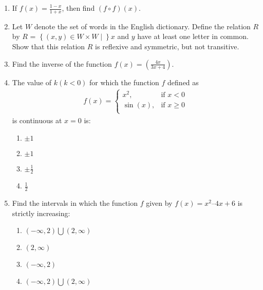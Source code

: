 \documentclass{article}
\providecommand{\cbrak}[1]{\ensuremath{\left\{#1\right\}}}
\begin{document}
\begin{enumerate}

\item If $f(x) = \frac{1-x}{1+x}$, then find $(f\circ f)(x)$.


\item Let $W$ denote the set of words in the English dictionary. Define the relation $R$ by
$R$ = $\cbrak{(x, y) \in W \times W \mid} x$ and $y$ have at least one letter in common.
Show that this relation $R$ is reflexive and symmetric, but not transitive.
\item Find the inverse of the function $f(x) = (\frac{4x}{3x+4})$.

\item The value of $k(k < 0)$ for which the function $f$ defined as 
\begin{align*}
f(x) = \begin{cases}
x^2, & \text{if } x < 0 \\
\sin(x), & \text{if } x \geq 0  \\
\end{cases}
\end{align*}
is continuous at $x = 0$ is:

\begin{enumerate}
     \item $\pm1$ 

     \item $\pm1$ 

     \item  $\pm\frac{1}{2}$ 

     \item  $\frac{1}{2}$ 

\end{enumerate}


\item Find the intervals in which the function $f$ given by $f(x) = x^2 – 4x + 6$ is strictly
increasing:

\begin{enumerate}

     \item $(-\infty,2) \bigcup (2,\infty)$ 
     
     \item $(2,\infty)$ 

     \item $(-\infty,2)$ 

     \item $(-\infty,2) \bigcup (2,\infty)$ 
\end{enumerate}


\end{enumerate}
\end{document}
